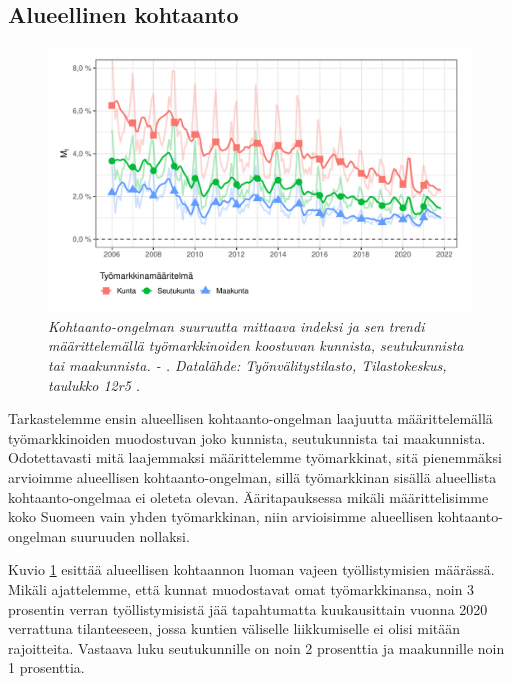 \documentclass[12pt]{article}
\newcommand{\lastdatamonth}{\unskip}
\newcommand{\firstdatamonth}{\unskip}
\newcommand{\newcaption}[1]{\caption{\textit{\footnotesize{#1}}}}
\begin{document}
\subsection{Alueellinen kohtaanto} \label{section:alueellinen_kohtaanto}

\begin{figure}
\centering
\includegraphics[scale = 0.8]{../kuviot/indeksi_alueittain.pdf}
    \newcaption{Kohtaanto-ongelman suuruutta mittaava indeksi ja sen trendi määrittelemällä työmarkkinoiden koostuvan kunnista, seutukunnista tai maakunnista.  \protect \firstdatamonth \phantom{} - \protect\lastdatamonth. Datalähde: Työnvälitystilasto, Tilastokeskus, taulukko 12r5 \protect \cite{svt2011}.}
   \label{fig:kdieksl}
\end{figure}

Tarkastelemme ensin alueellisen kohtaanto-ongelman laajuutta määrittelemällä työmarkkinoiden muodostuvan joko kunnista, seutukunnista tai maakunnista. Odotettavasti mitä laajemmaksi määrittelemme työmarkkinat, sitä pienemmäksi arvioimme alueellisen kohtaanto-ongelman, sillä työmarkkinan sisällä alueellista kohtaanto-ongelmaa ei oleteta olevan. Ääritapauksessa mikäli määrittelisimme koko Suomeen vain yhden työmarkkinan, niin arvioisimme alueellisen kohtaanto-ongelman suuruuden nollaksi.

Kuvio \ref{fig:kdieksl} esittää alueellisen kohtaannon luoman vajeen työllistymisien määrässä. Mikäli ajattelemme, että kunnat muodostavat omat työmarkkinansa, noin 3 prosentin verran työllistymisistä jää tapahtumatta kuukausittain vuonna 2020 verrattuna tilanteeseen, jossa kuntien väliselle liikkumiselle ei olisi mitään rajoitteita. Vastaava luku seutukunnille on noin 2 prosenttia ja maakunnille noin 1 prosenttia. 
\end{document}
